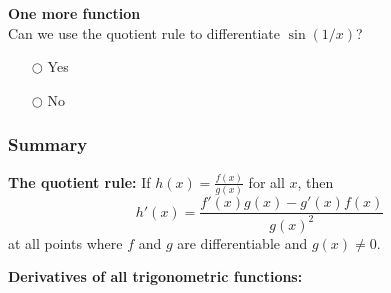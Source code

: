 \documentclass[pdftex, brazil, 12pt, twoside]{article}
\begin{document}
\begin{exercise}
  \textbf{One more function}\\%
  Can we use the quotient rule to differentiate $\sin{(1/x)}$?
  \begin{itemize}[noitemsep]
  \item[$\bigcirc$] Yes
  \item[$\bigcirc$] No
  \end{itemize}
\end{exercise}

\subsubsection{Summary}
\label{u2-quotient-rule-summary}

\textbf{The quotient rule:}
If $\displaystyle h(x) = \frac{f(x)}{g(x)}$ for all $x$, then
\begin{equation*}
  h'(x) = \frac{f'(x)g(x) - g'(x)f(x)}{g(x)^2}
\end{equation*}
at all points where $f$ and $g$ are differentiable and $g(x) \ne 0$.

\textbf{Derivatives of all trigonometric functions:}

\begin{figure}[H]
  \begin{center}
  \end{center}
\end{figure}
\end{document}
